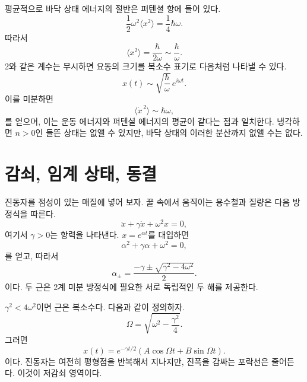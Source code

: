 평균적으로 바닥 상태 에너지의 절반은 퍼텐셜 항에 들어 있다.
\[
\frac12\omega^2\langle x^2\rangle
=\frac14\hbar\omega.
\]
따라서
\begin{equation}
\langle x^2\rangle=\frac{\hbar}{2\omega}
\sim\frac{\hbar}{\omega}.
\label{eq:c10-zero-point-position}
\end{equation}
2와 같은 계수는 무시하면 요동의 크기를 복소수 표기로 다음처럼 나타낼 수 있다.
\[
x(t)\sim\sqrt{\frac{\hbar}{\omega}}\,e^{i\omega t}.
\]
이를 미분하면
\begin{equation}
\langle\dot x^{\,2}\rangle\sim\hbar\omega,
\label{eq:c10-zero-point-velocity}
\end{equation}
를 얻으며, 이는 운동 에너지와 퍼텐셜 에너지의 평균이 같다는 점과 일치한다. 냉각하면 \(n>0\)인 들뜬 상태는 없앨 수 있지만, 바닥 상태의 이러한 분산까지 없앨 수는 없다.

\section{감쇠, 임계 상태, 동결}

진동자를 점성이 있는 매질에 넣어 보자. 꿀 속에서 움직이는 용수철과 질량은 다음 방정식을 따른다.
\begin{equation}
\ddot x+\gamma\dot x+\omega^2x=0,
\label{eq:c10-damped}
\end{equation}
여기서 \(\gamma>0\)는 항력을 나타낸다. \(x=e^{\alpha t}\)를 대입하면
\begin{equation}
\alpha^2+\gamma\alpha+\omega^2=0,
\end{equation}
를 얻고, 따라서
\begin{equation}
\alpha_\pm
=\frac{-\gamma\pm\sqrt{\gamma^2-4\omega^2}}{2}.
\label{eq:c10-damped-roots}
\end{equation}
이다. 두 근은 2계 미분 방정식에 필요한 서로 독립적인 두 해를 제공한다.

\begin{classroomqa}
\end{classroomqa}

\(\gamma^2<4\omega^2\)이면 근은 복소수다. 다음과 같이 정의하자.
\[
\Omega=\sqrt{\omega^2-\frac{\gamma^2}{4}}.
\]
그러면
\begin{equation}
x(t)=e^{-\gamma t/2}
\left(A\cos\Omega t+B\sin\Omega t\right).
\label{eq:c10-underdamped}
\end{equation}
이다. 진동자는 여전히 평형점을 반복해서 지나지만, 진폭을 감싸는 포락선은 줄어든다. 이것이 저감쇠 영역이다.

